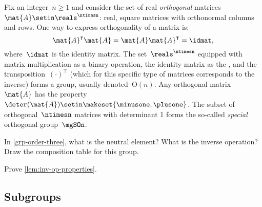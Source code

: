 \begin{example}

    Fix an integer~$n\geq 1$ and consider the set of real \emph{orthogonal} matrices~$\mat{A}\setin \reals^{\ntimesn}$:
    real, square matrices with orthonormal columns and rows.
    One way to express orthogonality of a matrix is:
    \begin{equation}
        \mat{A}^\intercal \mat{A}=\mat{A}\mat{A}^\intercal = \idmat,
    \end{equation}
    where~$\idmat$ is the identity matrix.
    The set~$\reals^{\ntimesn}$ equipped with matrix multiplication as a binary operation, the identity matrix as the , and the transposition~$(\cdot)^\intercal$ (which for this specific type of matrices corresponds to the inverse) forms a group, usually denoted~$\text{O}(n)$.
    Any orthogonal matrix~$\mat{A}$ has the property~$\deter(\mat{A})\setin \makeset{\minusone,\plusone}$.
    The subset of orthogonal~$\ntimesn$ matrices with determinant 1 forms the so-called \emph{special} orthogonal group~$\mgSOn$.
\end{example}

\vfill%

\begin{gradedexercise}
    \label{ex:GroupWithThreeElements}
    In \cref{grp-order-three}, what is the neutral element?
    What is the inverse operation?
    Draw the composition table for this group.
\end{gradedexercise}


\begin{gradedexercise}
    \label{ex:GroupInverseProperties}
    Prove \cref{lem:inv-op-properties}.
\end{gradedexercise}


\subsection{Subgroups}


